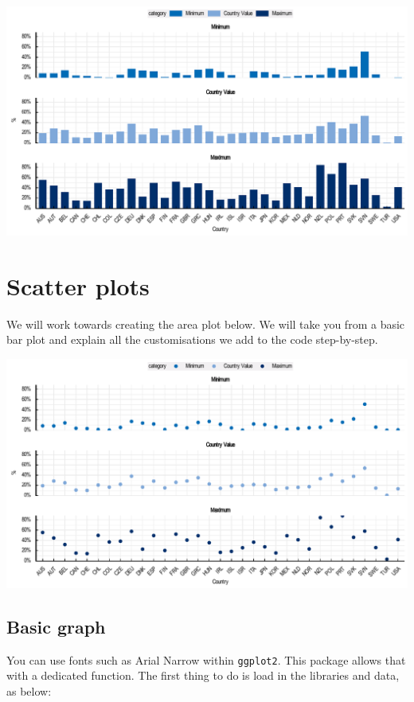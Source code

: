 \documentclass[
  11pt,
  oneside]{report}
\begin{document}
\begin{center}\includegraphics{book_figures/bar_6-1} \end{center}

\hypertarget{scatter-plots}{%
\chapter{Scatter plots}\label{scatter-plots}}

We will work towards creating the area plot below. We will take you from
a basic bar plot and explain all the customisations we add to the code
step-by-step.

\begin{center}\includegraphics{book_figures/scatterplot_final-1} \end{center}

\hypertarget{basic-graph-1}{%
\section{Basic graph}\label{basic-graph-1}}

You can use fonts such as Arial Narrow within \texttt{ggplot2}. This
package allows that with a dedicated function. The first thing to do is
load in the libraries and data, as below:
\end{document}
